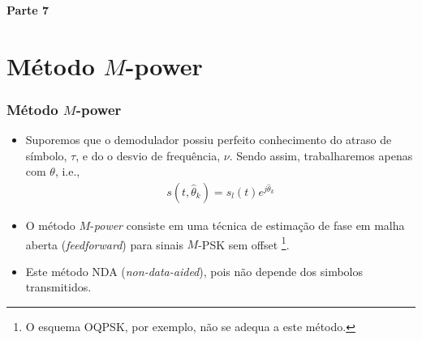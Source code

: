 
\begin{frame}
	\begin{block}{\centering\large\bfseries Parte 7}
		\centering\large\insertpart
	\end{block}
\end{frame}

\section{Método \(M\)-power}
\begin{frame}[t]
	\frametitle{Método \(M\)-power}
	
	\begin{itemize}
        \item Suporemos que o demodulador possiu perfeito conhecimento do atraso de símbolo, \(\tau\), e do o desvio de frequência, \(\nu\). Sendo assim, trabalharemos apenas com \(\theta\), i.e.,
        \begin{align}
            s(t, \hat{\theta}_{k}) = s_l (t) e^{j\hat{\theta}_{k}}
            \label{eq:s_t}
        \end{align}
        \item O método \(M\)-\textit{power} consiste em uma técnica de estimação de fase em malha aberta (\textit{feedforward}) para sinais \(M\)-PSK sem offset \footnote{O esquema OQPSK, por exemplo, não se adequa a este método.}.
        \item Este método NDA (\textit{non-data-aided}), pois não depende dos simbolos transmitidos.
    \end{itemize}
\end{frame}

